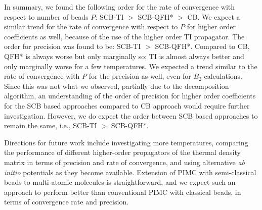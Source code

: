         In summary, we found the following order for the rate of convergence with respect to number of beads $P$: SCB-TI $>$ SCB-QFH* $>$ CB. We expect a similar trend for the rate of convergence with respect to $P$ for higher order coefficients as well, because of the use of the higher order TI propagator. The order for precision was found to be: SCB-TI $>$ SCB-QFH*. Compared to CB, QFH* is always worse but only marginally so; TI is almost always better and only marginally worse for a few temperatures. We expected a trend similar to the rate of convergence with $P$ for the precision as well, even for $B_2$ calculations. Since this was not what we observed, partially due to the decomposition algorithm, an understanding of the order of precision for higher order coefficients for the SCB based approaches compared to CB approach would require further investigation. However, we do expect the order between SCB based approaches to remain the same, i.e., SCB-TI $>$ SCB-QFH*.

        Directions for future work include investigating more temperatures, comparing the performance of different higher-order propagators of the thermal density matrix in terms of precision and rate of convergence, and using alternative \emph{ab initio} potentials as they become available. Extension of PIMC with semi-classical beads to multi-atomic molecules is straightforward, and we expect such an approach to perform better than conventional PIMC with classical beads, in terms of convergence rate and precision. 
